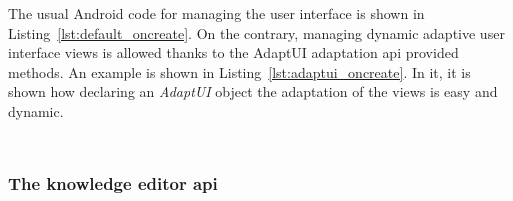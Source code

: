 The usual Android code for managing the user interface is shown in Listing~\ref{lst:default_oncreate}.
On the contrary, managing dynamic adaptive user interface views is allowed thanks
to the AdaptUI adaptation \ac{api} provided methods. An example is shown in
Listing~\ref{lst:adaptui_oncreate}. In it, it is shown how declaring an \textit{AdaptUI}
object the adaptation of the views is easy and dynamic.


\inputminted[linenos=true, fontsize=\footnotesize, frame=lines]{java}{5_experiments_and_results/default_oncreate.java}

\inputminted[linenos=true, fontsize=\footnotesize, frame=lines]{java}{5_experiments_and_results/adaptui_oncreate.java}

\subsubsection{The knowledge editor \ac{api}}
\label{sec:knowledge_api}